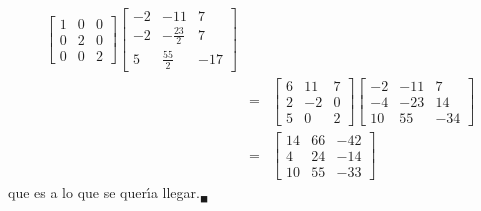 \begin{solucion}
\begin{enumerate}[$a$)]
\begin{eqnarray*}
\begin{bmatrix}
    1 & 0 & 0 \\
    0 & 2 & 0 \\
    0 & 0 & 2
   \end{bmatrix}
   \begin{bmatrix}
    -2 & -11 & 7 \\
    -2 & -\frac{23}{2} & 7 \\
    5 & \frac{55}{2} & -17
   \end{bmatrix} \\
   & = &
   \begin{bmatrix}
    6 & 11 & 7 \\
    2 & -2 & 0 \\
    5 &  0 & 2
   \end{bmatrix}
   \begin{bmatrix}
    -2 & -11 &   7 \\
    -4 & -23 &  14 \\
    10 &  55 & -34
   \end{bmatrix} \\
   & = & 
   \begin{bmatrix}
    14 & 66 & -42 \\
     4 & 24 & -14 \\
    10 & 55 & -33
   \end{bmatrix}
  \end{eqnarray*}
  que es a lo que se quer\'{\i}a llegar.${}_{\blacksquare}$
 \end{enumerate}

\end{solucion}

